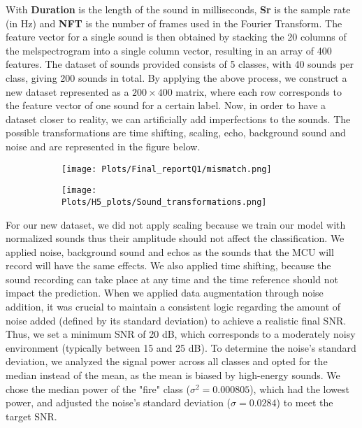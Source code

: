 \documentclass{article}
\begin{document}
With \textbf{Duration} is the length of the sound in milliseconds, \textbf{Sr} is the sample rate (in Hz)
and \textbf{NFT} is the number of frames used in the Fourier Transform. The feature vector for a single sound is then obtained by stacking the 20 columns of the melspectrogram into a single column vector, resulting in an array of 400 features. The dataset of sounds provided consists of 5 classes, with 40 sounds per class, giving 200 sounds in total. By applying the above process, we construct a new dataset represented as a $200 \times 400$ matrix, where each row corresponds to the feature vector of one sound for a certain label. Now, in order to have a dataset closer to reality, we can artificially add imperfections to the sounds. The possible transformations are time shifting, scaling, echo, background sound and noise and are represented in the figure below.
\begin{figure}[h]
    \centering
    \begin{subfigure}[b]{0.54\linewidth}
        \centering
        \texttt{[image: Plots/Final\_reportQ1/mismatch.png]}
        \label{fig:mm}
    \end{subfigure}
    \hfill
    \begin{subfigure}[b]{0.44\linewidth}
        \centering
        \texttt{[image: Plots/H5\_plots/Sound\_transformations.png]}
        \label{fig:dataaug}
    \end{subfigure}
\end{figure}


For our new dataset, we did not apply scaling because we train our model with normalized sounds thus their amplitude should not affect the classification. We applied noise, background sound and echos as the sounds that the MCU will record will have the same effects. 
We also applied time shifting, because the sound recording can take place at any time and the time reference should not impact the prediction. When we applied data augmentation through noise addition, it was crucial to maintain a consistent logic regarding the amount of noise added (defined by its standard deviation) to achieve a realistic final SNR. Thus, we set a minimum SNR of 20 dB, which corresponds to a moderately noisy environment (typically between 15 and 25 dB). To determine the noise's standard deviation, we analyzed the signal power across all classes and opted for the median instead of the mean, as the mean is biased by high-energy sounds. We chose the median power of the "fire" class ($\sigma^2 = 0.000805$), which had the lowest power, and adjusted the noise's standard deviation ($\sigma = 0.0284$) to meet the target SNR.
\end{document}

